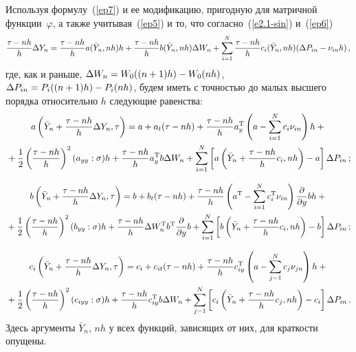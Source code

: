 {Используя формулу~(\ref{ep7}) и ее модификацию, пригодную для матричной
функции~$\varphi$, а также учитывая~(\ref{ep5}) и то, что согласно~(\ref{e2.1-sin}) и~(\ref{ep6})
\begin{equation}    
\ovth \Delta Y_n=\ovth a(\bar Y_n,nh)h+\ovth b(\bar Y_n,nh)\Delta W_n+
\sumin \ovth c_i(\bar Y_n,nh)(\Delta P_{in}-\nu_{in}h)\,,\label{ep9}
\end{equation}
где, как и раньше, $\Delta W_n\hm=W_0((n+1)h)-W_0(nh)$, $\Delta
P_{in}\hm=P_i((n+1)h)\hm-P_i(nh)$, будем иметь с точностью до малых высшего
порядка относительно $h$ следующие равенства:
    \begin{multline}
     a\left(\bar Y_n+\ovth \Delta Y_n,\tau \right)=a
    +a_t(\tau-nh)+\ovth a_y^{\mathrm{T}}\left(a-\sumin c_i\nu_{in}\right)h+{}\\
    {}+
    \fr{1}{2}\left(\ovth\right)^2(a_{yy}:\sigma)h+\ovth a_y^{\mathrm{T}} b\Delta W_n+
    \sumin \left[a\left(\bar Y_n+\ovth c_i,nh\right)-
    a\right]\Delta P_{in}\,;\label{ep10}
    \end{multline}

\vspace*{-12pt}

\noindent
\begin{multline}
 b\left(\bar Y_n+\ovth \Delta Y_n,\tau \right)=
    b+b_{t}(\tau-nh)+\ovth  \left(a^{\mathrm{T}}-\sumin c_i^{\mathrm{T}}\nu_{in}\right)\fr{\partial}
    {\partial y}bh+{}\\
    {}+\fr{1}{2}\left(\ovth\right)^2(b_{yy}:\sigma)h+
    \ovth  \Delta W_n^{\mathrm{T}} b^{\mathrm{T}}\fr{\partial}{\partial y} b+
    \sumin \left[b\left(\bar Y_n+\ovth  c_i,nh\right)-b\right]\Delta P_{in}\,;\label{ep11}
    \end{multline}
    
    \vspace*{-12pt}
    
    \noindent
    \begin{multline}
     c_i\left(\bar Y_n+\ovth \Delta Y_n,\tau \right)=c_i+c_{it}(\tau-nh)+
    \ovth c_{iy}^{\mathrm{T}} \left(a-\sum\limits_{j=1}^N c_j\nu_{jn}\right)h+{}\\
    {}+\fr{1}{2}
    \left(\ovth\right)^2(c_{iyy}:\sigma)h+\ovth c_{iy}^{\mathrm{T}} b\Delta W_n+
    \sum\limits_{j=1}^N \left[c_i\left(\bar Y_n+\ovth c_j,nh\right)
    -c_i\right]\Delta P_{in}\,.\label{ep12}
    \end{multline}
Здесь аргументы $\bar Y_n$, $nh$ у всех функций, зависящих от них,
для краткости опущены.

}
